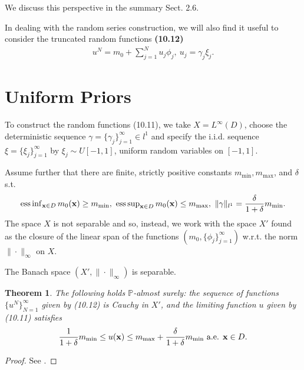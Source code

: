 \documentclass[oneside,11pt]{book}
\numberwithin{equation}{section}
\newtheorem{theorem}{Theorem}[section]
\begin{document}
We discuss this perspective in the summary Sect. 2.6.

In dealing with the random series construction, we will also find it useful to consider the truncated random functions \textbf{(10.12)}
\begin{align*}
    u^N = m_0 + \sum_{j=1}^N u_j\phi_j,\ u_j = \gamma_j\xi_j.
\end{align*}

\section{Uniform Priors}
To construct the random functions (10.11), we take $X = L^\infty(D)$, choose the deterministic sequence $\gamma = \{\gamma_j\}_{j=1}^\infty\in l^1$ and specify the i.i.d. sequence $\xi = \{\xi_j\}_{j=1}^\infty$ by $\xi_j\sim U[-1,1]$, uniform random variables on $[-1,1]$.

Assume further that there are finite, strictly positive constants $m_{\min},m_{\max}$, and $\delta$ s.t.
\begin{align*}
    \operatorname{ess\inf}_{{\bf x}\in D} m_0({\bf x})\ge m_{\min},\ \operatorname{ess\sup}_{{\bf x}\in D} m_0({\bf x})\le m_{\max},\ \|\gamma\|_{l^1} = \frac{\delta}{1 + \delta}m_{\min}.
\end{align*}
The space $X$ is not separable and so, instead, we work with the space $X'$ found as the closure of the linear span of the functions $(m_0,\{\phi_j\}_{j=1}^\infty)$ w.r.t. the norm $\|\cdot\|_\infty$ on $X$.

The Banach space $(X',\|\cdot\|_\infty)$ is separable.

\begin{theorem}
    The following holds $\mathbb{P}$-almost surely: the sequence of functions $\{u^N\}_{N=1}^\infty$ given by (10.12) is Cauchy in $X'$, and the limiting function $u$ given by (10.11) satisfies
    \begin{align*}
        \frac{1}{1 + \delta}m_{\min}\le u({\bf x})\le m_{\max} + \frac{\delta}{1 + \delta}m_{\min} \mbox{ a.e. } {\bf x}\in D.
    \end{align*}
\end{theorem}

\begin{proof}
    See \cite[pp. 322--323]{Dashti_Stuart2017}.
\end{proof}
\end{document}
